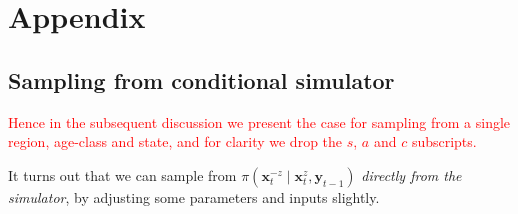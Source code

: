 \documentclass[a4paper]{article}
\newcommand{\bx}{\bm{x}}
\newcommand{\by}{\bm{y}}
\begin{document}
\section{Appendix}

\subsection{Sampling from conditional simulator}\label{sec:condsim}

\textcolor{red}{Hence in the subsequent discussion we present the case for sampling from a single region, age-class and state, and for clarity we drop the $s$, $a$ and $c$ subscripts.}

It turns out that we can sample from $\pi\left(\bx^{-z}_t \mid \bx^z_t, \by_{t - 1}\right)$ \textit{directly from the simulator}, by adjusting some parameters and inputs slightly.
\end{document}
